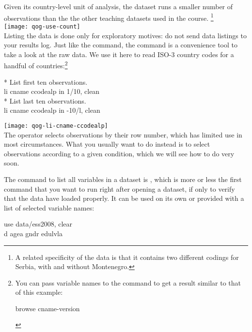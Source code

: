 	Given its country-level unit of analysis, the \QOG dataset runs a smaller number of observations than the the other teaching datasets used in the course.%
		\footnote{A related specificity of the data is that it contains two different codings for Serbia, with and without Montenegro.}\\[1em]%
		
		\texttt{[image: qog-use-count]}\\[1em]

Listing the data is done only for exploratory motives: do not send data listings to your results log. Just like the  command, the  command is a convenience tool to take a look at the raw data. We use it here to read ISO-3 country codes for a handful of countries:\footnote{You can pass variable names to the  command to get a result similar to that of this \QOG example:%
		\begin{docspec}
			browse cname-version
		\end{docspec}}\\[1em]

\begin{docspec}
	* List first ten observations.\\
	li cname ccodealp in 1/10, clean\\[1em]
	
	* List last ten observations.\\
	li cname ccodealp in -10/l, clean
\end{docspec}

\texttt{[image: qog-li-cname-ccodealp]}\\[1em]

The  operator selects observations by their row number, which has limited use in most circumstances.%
	What you usually want to do instead is to select observations according to a given condition, which we will see how to do very soon.

 The command to list all variables in a dataset is , which is more or less the first command that you want to run right after opening a dataset, if only to verify that the data have loaded properly. It can be used on its own or provided with a list of selected variable names:\\[1em]

\begin{docspec}
	use data/ess2008, clear\\
	d agea gndr edulvla
\end{docspec}

